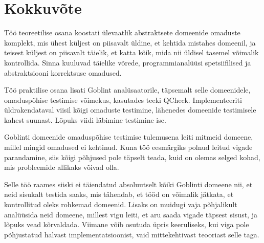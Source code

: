 \documentclass[../thesis.tex]{subfiles}
\begin{document}
\section*{Kokkuvõte}

Töö teoreetilise osana koostati ülevaatlik abstraktsete domeenide omaduste komplekt, mis ühest küljest on piisavalt üldine, et kehtida mistahes domeenil, ja teisest küljest on piisavalt täielik, et katta kõik, mida nii üldisel tasemel võimalik kontrollida. Sinna kuuluvad täielike võrede, programmianalüüsi spetsiifilised ja abstraktsiooni korrektsuse omadused.

Töö praktilise osana lisati Goblint analüsaatorile, täpsemalt selle domeenidele, omaduspõhise testimise võimekus, kasutades teeki QCheck. Implementeeriti üldrakendataval viisil kõigi omaduste testimine, lähenedes domeenide testimisele kahest suunast. Lõpuks viidi läbimine testimine ise.

Goblinti domeenide omaduspõhise testimise tulemusena leiti mitmeid domeene, millel mingid omadused ei kehtinud. Kuna töö eesmärgiks polnud leitud vigade parandamine, siis kõigi põhjused pole täpselt teada, kuid on olemas selged kohad, mis probleemide allikaks võivad olla.

Selle töö raames siiski ei täiendatud absoluutselt kõiki Goblinti domeene nii, et neid sisukalt testida saaks, mis tähendab, et tööd on võimalik jätkata, et kontrollitud oleks rohkemad domeenid. Lisaks on muidugi vaja põhjalikult analüüsida neid domeene, millest vigu leiti, et aru saada vigade täpsest sisust, ja lõpuks vead kõrvaldada. Viimane võib osutuda üpris keeruliseks, kui viga pole põhjustatud halvast implementatsioonist, vaid mittekehtivast teooriast selle taga.


\end{document}

